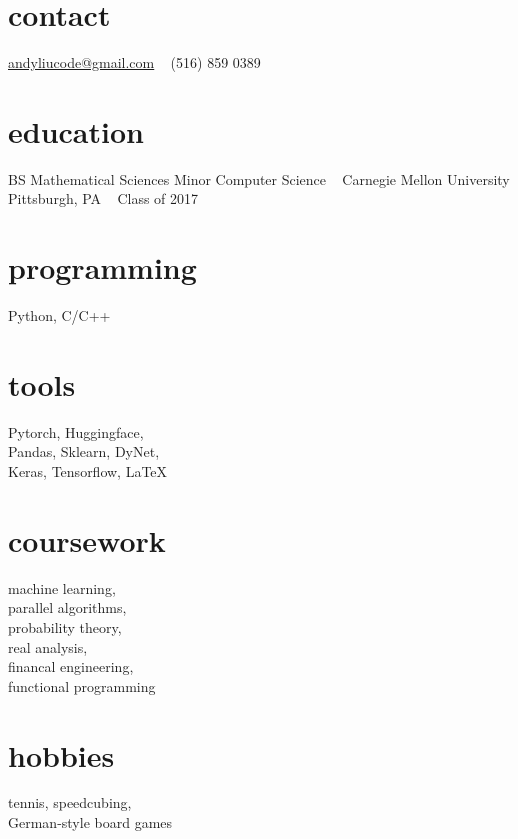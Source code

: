 \documentclass[print]{friggeri-cv} %
\begin{document}


\begin{aside} %
\section{contact}
\href{mailto:andyliucode@gmail.com}{andyliucode@gmail.com}
~
(516) 859 0389
\section{education}
BS Mathematical Sciences
Minor Computer Science
~
Carnegie Mellon University
Pittsburgh, PA
~
Class of 2017
\section{programming} 
Python, C/C++
\section{tools}
Pytorch, Huggingface, \\Pandas, Sklearn, DyNet, \\Keras, Tensorflow, LaTeX
\section{coursework}
machine learning, \\parallel algorithms, \\probability theory, \\real analysis, \\financal engineering, \\functional programming
\section{hobbies}
tennis, speedcubing, \\German-style board games
\end{aside}

\end{document}

